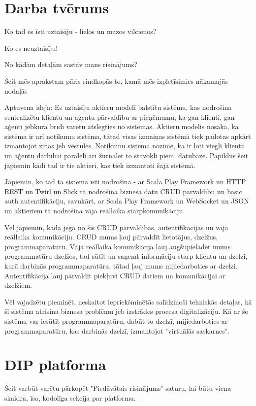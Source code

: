 \section{Darba tvērums}

Ko tad es īsti uztaisīju - lielos un mazos vilcienos?

Ko es neuztaisīju!
  
No kādām detaļām sastāv mans risinājums?

Šeit mēs aprakstam pāris rindkopās to, kamā mēs izpletīsimies nākamajās nodaļās

Aptuvena ideja: Es uztaisīju aktieru modelī balstītu sistēmu, kas nodrošina centralizētu klientu un aģentu pārvaldību
ar pieņēmumu, ka gan klienti, gan aģenti jebkurā brīdī varētu atslēgties no sistēmas. Aktieru modelis nosaka, ka sistēma
ir arī notikumu sistēma, tātad visas izmaiņas sistēmā tiek padotas apkārt izmantojot ziņas jeb vēstules. Notikumu sistēma
nozīmē, ka ir ļoti viegli klientu un aģentu darbībai paralēli arī žurnalēt to stāvokli piem. datubāzē. Papildus šeit jāpiemin
kādi tad ir tie aktieri, kas tiek izmantoti šajā sistēmā. 

Jāpiemin, ko tad tā sistēma īsti nodrošina - ar Scala Play Framework un HTTP REST un Twirl un Slick tā nodrošina biznesa datu CRUD pārvaldību un
basic auth autentifikāciju, savukārt, ar Scala Play Framework un WebSocket un JSON un aktieriem tā nodrošina vāja reāllaika starpkomunikāciju.  

Vēl jāpiemin, kāda jēga no šīs CRUD pārvaldības, autentifikācijas un vāja reāllaika komunikāciju. CRUD mums ļauj pārvaldīt lietotājus, dzelžus,
programmaparatūru. Vājā reāllaika komunikācija ļauj augšupielādēt mums programmatūru dzelžos, tad sūtīt un saņemt informāciju starp klientu un dzelzi, 
kurā darbinās programmaparatūra, tātad ļauj mums mijiedarboties ar dzelzi. Autentifikācija ļauj pārvaldīt piekļuvi CRUD datiem un
komunikācijai ar dzelžiem.

Vēl vajadzētu pieminēt, neskaitot iepriekšminētās salīdzinoši tehniskās detaļas, kā šī sistēma atrisina biznesa problēmu jeb izstrādes procesa
digitalizāciju. Kā ar šo sistēmu var iesūtīt programmaparatūru, dabūt to dzelzī, mijiedarboties ar programmaparatūru, kas darbinās dzelzī, izmantojot
"virtuālās saskarnes".  

\section{DIP platforma}

Šeit varbūt varētu pārkopēt "Piedāvātais risinājums" saturu, lai būtu viena skaidra, īsa, kodolīga sekcija par platformu. 

